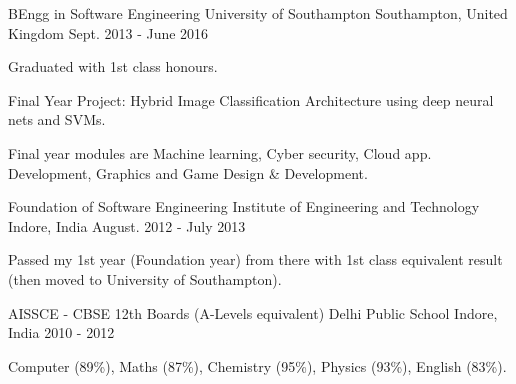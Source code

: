 

\begin{cventries}
	
	\cventry
		{BEngg in Software Engineering} %
		{University of Southampton} %
		{Southampton, United Kingdom} %
		{Sept. 2013 - June 2016} %
		{
		\begin{cvitems} %
			\item {Graduated with 1st class honours.}
			\item {Final Year Project: Hybrid Image Classification Architecture using deep neural nets and SVMs.}
			\item {Final year modules are Machine learning, Cyber security, Cloud app. Development, Graphics and Game Design \& Development.}
		\end{cvitems}
		}		
	
	
	\cventry
	{Foundation of Software Engineering} %
	{Institute of Engineering and Technology} %
	{Indore, India} %
	{August. 2012 - July 2013} %
	{
		\begin{cvitems} %
			\item {Passed my 1st year (Foundation year) from there with 1st class equivalent result (then moved to University of Southampton).}
		\end{cvitems}
	}
	
	\cventry
	{AISSCE - CBSE 12th Boards (A-Levels equivalent)} %
	{Delhi Public School} %
	{Indore, India} %
	{2010 - 2012} %
	{
		\begin{cvitems} %
			\item {Computer (89\%), Maths (87\%), Chemistry (95\%), Physics (93\%), English (83\%).}
		\end{cvitems}
	}
	
	
	
\end{cventries}